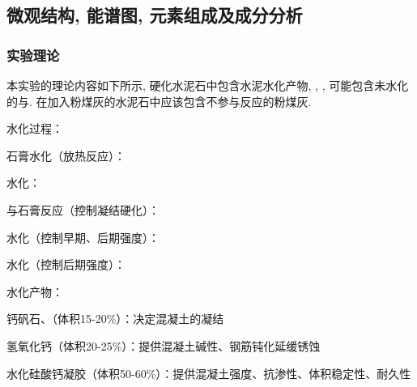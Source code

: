 \subsection{微观结构, 能谱图, 元素组成及成分分析}

\subsubsection{实验理论}
本实验的理论内容如下所示, 硬化水泥石中包含水泥水化产物, , , 可能包含未水化的与. 在加入粉煤灰的水泥石中应该包含不参与反应的粉煤灰.

\begin{center}
  水化过程：

  石膏水化（放热反应）：

  水化：
  
  \vspace{+1.em}
  与石膏反应（控制凝结硬化）：

  
  \vspace{+1.em}
  水化（控制早期、后期强度）：
  
  
  \vspace{+1.em}
  水化（控制后期强度）：
  
  
  \vspace{+1.em}
  水化产物：

  钙矾石、（体积15-20\%）：决定混凝土的凝结

  氢氧化钙（体积20-25\%）：提供混凝土碱性、钢筋钝化延缓锈蚀

  水化硅酸钙凝胶（体积50-60\%）：提供混凝土强度、抗渗性、体积稳定性、耐久性

\end{center}

